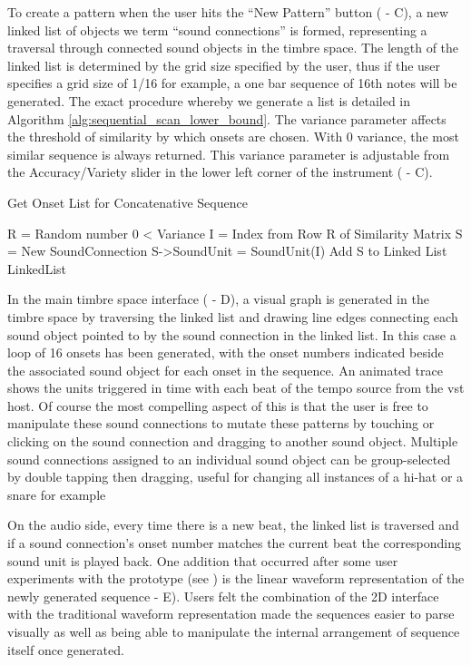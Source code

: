 To create a pattern when the user hits the ``New Pattern'' button ( - C), a new linked list of objects we term ``sound connections'' is formed, representing a traversal through connected sound objects in the timbre space. The length of the linked list is determined by the grid size specified by the user, thus if the user specifies a grid size of 1/16 for example, a one bar sequence of 16th notes will be generated. The exact procedure whereby we generate a list is detailed in Algorithm \ref{alg:sequential_scan_lower_bound}. The variance parameter affects the threshold of similarity by which onsets are chosen. With 0 variance, the most similar sequence is always returned. This variance parameter is adjustable from the Accuracy/Variety slider in the lower left corner of the instrument ( - C).

\begin{algorithm}
	\caption{Get Onset List for Concatenative Sequence}
	\label{alg:sequential_scan_lower_bound}
	\begin{algorithmic}
			\State R = Random number 0 < Variance
			\State I = Index from Row R of Similarity Matrix
			\State S = New SoundConnection
			\State S->SoundUnit = SoundUnit(I)
			\State Add S to Linked List
		\EndFor
		\\
	\Return	LinkedList	
	\end{algorithmic}
\end{algorithm}
 
In the main timbre space interface ( - D), a visual graph is generated in the timbre space by traversing the linked list and drawing line edges connecting each sound object pointed to by the sound connection in the linked list. In this case a loop of 16 onsets has been generated, with the onset numbers indicated beside the associated sound object for each onset in the sequence. An animated trace shows the units triggered in time with each beat of the tempo source from the \acrshort{vst} host. Of course the most compelling aspect of this is that the user is free to manipulate these sound connections to mutate these patterns by touching or clicking on the sound connection and dragging to another sound object. Multiple sound connections assigned to an individual sound object can be group-selected by double tapping then dragging, useful for changing all instances of a hi-hat or a snare for example

On the audio side, every time there is a new beat, the linked list is traversed and if a sound connection's onset number matches the current beat the corresponding sound unit is played back. One addition that occurred after some user experiments with the prototype (see )  is the linear waveform representation of the newly generated sequence  - E). Users felt the combination of the 2D interface with the traditional waveform representation made the sequences easier to parse visually as well as being able to manipulate the internal arrangement of sequence itself once generated.

